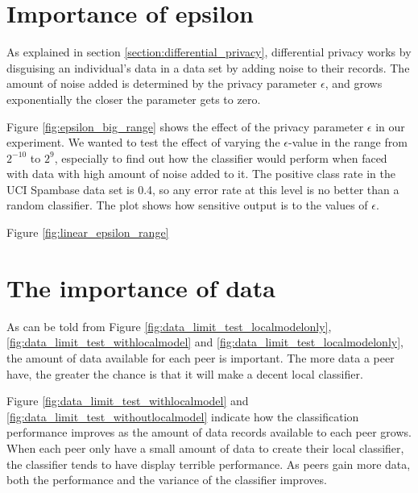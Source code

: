 
\section{Importance of epsilon}
As explained in section \ref{section:differential_privacy}, differential privacy works by disguising an individual's data in a data set by adding noise to their records. The amount of noise added is determined by the privacy parameter  $\epsilon$, and grows exponentially the closer the parameter gets to zero. 

 
Figure \ref{fig:epsilon_big_range} shows the effect of the privacy parameter $\epsilon$ in our experiment. We wanted to test the effect of varying the $\epsilon$-value in the range from $2^{-10}$ to $2^9$, especially to find out how the classifier would perform when faced with data with high amount of noise added to it. The positive class rate in the UCI Spambase data set is 0.4, so any error rate at this level is no better than a random classifier. The plot shows how sensitive output is to the values of $\epsilon$.

Figure \ref{fig:linear_epsilon_range} 

\section{The importance of data} \label{importance_of_data}
As can be told from Figure \ref{fig:data_limit_test_localmodelonly}, \ref{fig:data_limit_test_withlocalmodel} and \ref{fig:data_limit_test_localmodelonly}, the amount of data available for each peer is important. The more data a peer have, the greater the chance is that it will make a decent local classifier. 



Figure \ref{fig:data_limit_test_withlocalmodel} and \ref{fig:data_limit_test_withoutlocalmodel} indicate how the classification performance improves as the amount of data records available to each peer grows. When each peer only have a small amount of data to create their local classifier, the classifier tends to have display terrible performance. As peers gain more data, both the performance and the variance of the classifier improves.     

